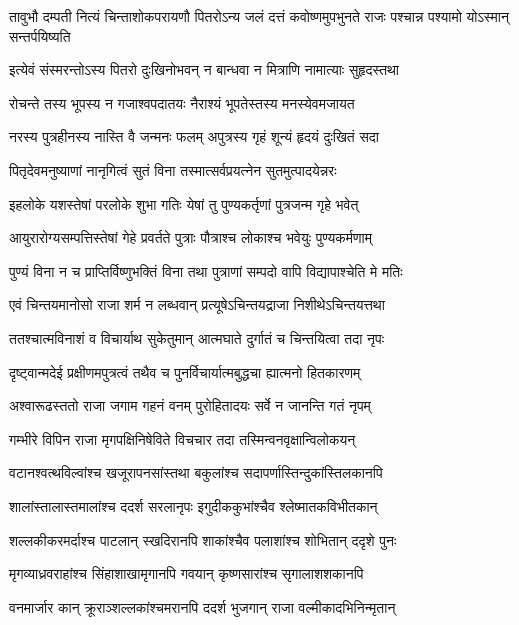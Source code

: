\threelineshloka
{तावुभौ दम्पती नित्यं चिन्ताशोकपरायणौ}
{पितरोऽन्य जलं दत्तं कवोष्णमुपभुनते}
{राजः पश्चान्न पश्यामो योऽस्मान् सन्तर्पयिष्यति} %

\twolineshloka
{इत्येवं संस्मरन्तोऽस्य पितरो दुःखिनोभवन्}
{न बान्धवा न मित्राणि नामात्याः सुहृदस्तथा} %

\twolineshloka
{रोचन्ते तस्य भूपस्य न गजाश्वपदातयः}
{नैराश्यं भूपतेस्तस्य मनस्येवमजायत} %

\twolineshloka
{नरस्य पुत्रहीनस्य नास्ति वै जन्मनः फलम्}
{अपुत्रस्य गृहं शून्यं हृदयं दुःखितं सदा} %

\twolineshloka
{पितृदेवमनुष्याणां नानृगित्वं सुतं विना}
{तस्मात्सर्वप्रयत्नेन सुतमुत्पादयेन्नरः} %

\twolineshloka
{इहलोके यशस्तेषां परलोके शुभा गतिः}
{येषां तु पुण्यकर्तृणां पुत्रजन्म गृहे भवेत्} %

\twolineshloka
{आयुरारोग्यसम्पत्तिस्तेषां गेहे प्रवर्तते}
{पुत्राः पौत्राश्च लोकाश्च भवेयुः पुण्यकर्मणाम्} %

\twolineshloka
{पुण्यं विना न च प्राप्तिर्विष्णुभक्तिं विना तथा}
{पुत्राणां सम्पदो वापि विद्यापाश्चेति मे मतिः} %

\twolineshloka
{एवं चिन्तयमानोसो राजा शर्म न लब्धवान्}
{प्रत्यूषेऽचिन्तयद्राजा निशीथेऽचिन्तयत्तथा} %

\twolineshloka
{ततश्चात्मविनाशं व विचार्याथ सुकेतुमान्}
{आत्मघाते दुर्गातं च चिन्तयित्वा तदा नृपः} %

\twolineshloka
{दृष्ट्वान्मदेई प्रक्षीणमपुत्रत्वं तथैव च}
{पुनर्विचार्यात्मबुद्धचा ह्यात्मनो हितकारणम्} %

\twolineshloka
{अश्वारूढस्ततो राजा जगाम गहनं वनम्}
{पुरोहितादयः सर्वे न जानन्ति गतं नृपम्} %

\twolineshloka
{गम्भीरे विपिन राजा मृगपक्षिनिषेविते}
{विचचार तदा तस्मिन्वनवृक्षान्विलोकयन्} %

\twolineshloka
{वटानश्वत्थविल्वांश्च खजूरापनसांस्तथा}
{बकुलांश्च सदापर्णास्तिन्दुकांस्तिलकानपि} %

\twolineshloka
{शालांस्तालास्तमालांश्च ददर्श सरलानृपः}
{इगुदीककुभांश्चैव श्लेष्मातकविभीतकान्} %

\twolineshloka
{शल्लकीकरमर्दाश्च पाटलान् स्खदिरानपि}
{शाकांश्चैव पलाशांश्च शोभितान् ददृशे पुनः} %

\twolineshloka
{मृगव्याध्रवराहांश्च सिंहाशाखामृगानपि}
{गवयान् कृष्णसारांश्च सृगालाशशकानपि} %

\twolineshloka
{वनमार्जार कान् क्रूराञ्शल्लकांश्चमरानपि}
{ददर्श भुजगान् राजा वल्मीकादभिनिन्मृतान्} %

